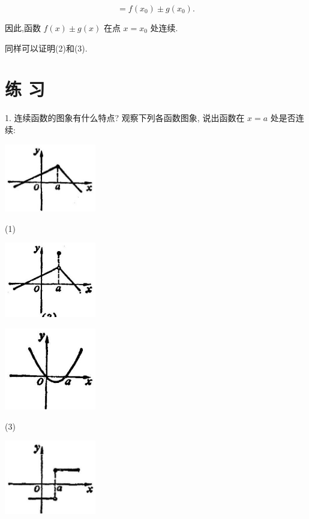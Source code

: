 \documentclass[10pt]{article}
\begin{document}
\[
= f\left( {x}_{0}\right) \pm g\left( {x}_{0}\right) \text{.}
\]

因此,函数 \(f\left( x\right) \pm g\left( x\right)\) 在点 \(x = {x}_{0}\) 处连续.

同样可以证明(2)和(3).

\section*{练 习}

1. 连续函数的图象有什么特点? 观察下列各函数图象, 说出函数在 \(x = a\) 处是否连续:

\begin{center}
\includegraphics[max width=0.3\textwidth]{images/01912c18-5c3f-733d-b775-749ba9897a9d_35_115885.jpg}
\end{center}

(1)

\begin{center}
\includegraphics[max width=0.3\textwidth]{images/01912c18-5c3f-733d-b775-749ba9897a9d_35_560451.jpg}
\end{center}

\begin{center}
\includegraphics[max width=0.3\textwidth]{images/01912c18-5c3f-733d-b775-749ba9897a9d_35_351282.jpg}
\end{center}

(3)

\begin{center}
\includegraphics[max width=0.3\textwidth]{images/01912c18-5c3f-733d-b775-749ba9897a9d_36_706273.jpg}
\end{center}
\end{document}
